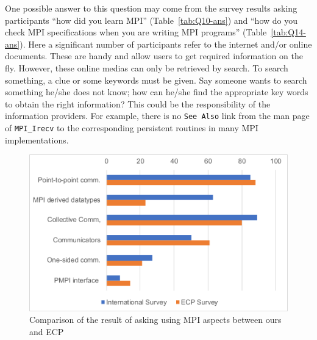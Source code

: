 \documentclass[sigconf,nonacm]{acmart}
\begin{document}
One possible answer to this question may come from the survey results
asking participants ``how did you learn MPI''
(Table~\ref{tab:Q10-ans}) and ``how do you check
MPI specifications when you are writing MPI programs''
(Table~\ref{tab:Q14-ans}).
Here a significant number of participants refer to the internet
and/or online documents. These are handy and allow users to get
required information on the fly. However,
these online medias can only be retrieved by
search. To search something, a clue or some keywords must be given.
Say someone wants to search something he/she does not know; how can he/she
find the appropriate key words to obtain the right information?
This could be the responsibility of the information providers. For example,
there is no {\tt See Also} link from the man page of {\tt MPI\_Irecv}
to the corresponding persistent routines in many MPI implementations.


\begin{figure}[htb]%
  \begin{center}%
   \includegraphics[width=0.8\hsize]{figs/ECP.pdf}
    \caption{Comparison of the result of asking using MPI aspects
      between ours and ECP}
    \label{fig:ecp-comparison}
  \end{center}
\end{figure}
\end{document}
